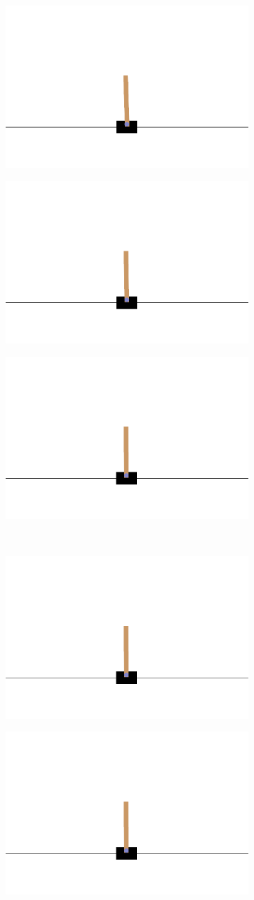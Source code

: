 \begin{figure}[H]
	\centering
	\begin{subfigure}
		\centering
		\includegraphics[width=0.3\linewidth]{Images/frames/GA/1.png}
	\end{subfigure}
	\hfill
	\begin{subfigure}
		\centering
		\includegraphics[width=0.3\linewidth]{Images/frames/GA/2.png}
	\end{subfigure}
	\hfill
	\begin{subfigure}
		\centering
		\includegraphics[width=0.3\linewidth]{Images/frames/GA/3.png}
	\end{subfigure}
	\\
	\begin{subfigure}
		\centering
		\includegraphics[width=0.3\linewidth]{Images/frames/GA/4.png}
	\end{subfigure}
	\hfill
	\begin{subfigure}
		\centering
		\includegraphics[width=0.3\linewidth]{Images/frames/GA/5.png}
	\end{subfigure}

\end{figure}
